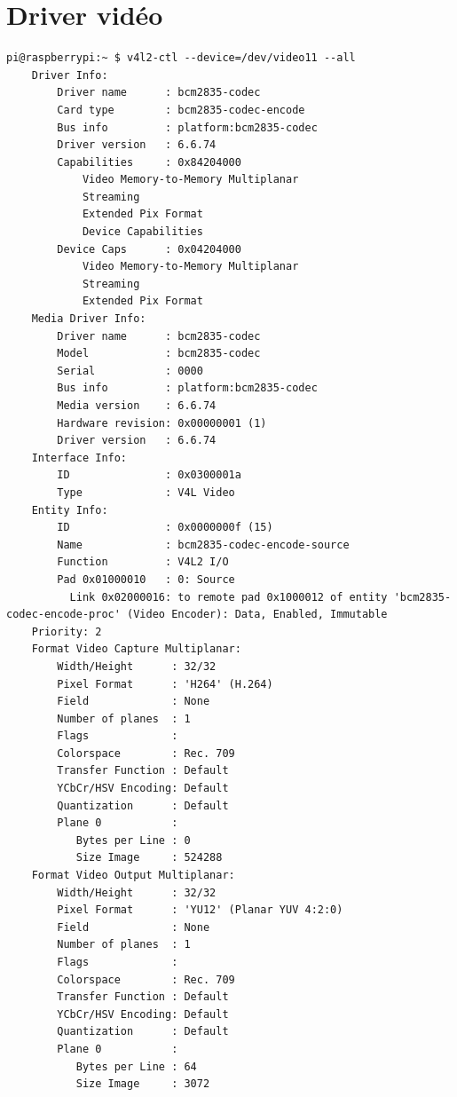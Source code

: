 \documentclass[a4paper, 11pt, french]{article}
\begin{document}
\section{Driver vidéo} \label{ann:driverVideo}
\begin{lstlisting}[caption={Propriétes du driver vidéo utilisé pour encoder le flux vidéo},captionpos=b]
    pi@raspberrypi:~ $ v4l2-ctl --device=/dev/video11 --all
    Driver Info:
        Driver name      : bcm2835-codec
        Card type        : bcm2835-codec-encode
        Bus info         : platform:bcm2835-codec
        Driver version   : 6.6.74
        Capabilities     : 0x84204000
            Video Memory-to-Memory Multiplanar
            Streaming
            Extended Pix Format
            Device Capabilities
        Device Caps      : 0x04204000
            Video Memory-to-Memory Multiplanar
            Streaming
            Extended Pix Format
    Media Driver Info:
        Driver name      : bcm2835-codec
        Model            : bcm2835-codec
        Serial           : 0000
        Bus info         : platform:bcm2835-codec
        Media version    : 6.6.74
        Hardware revision: 0x00000001 (1)
        Driver version   : 6.6.74
    Interface Info:
        ID               : 0x0300001a
        Type             : V4L Video
    Entity Info:
        ID               : 0x0000000f (15)
        Name             : bcm2835-codec-encode-source
        Function         : V4L2 I/O
        Pad 0x01000010   : 0: Source
          Link 0x02000016: to remote pad 0x1000012 of entity 'bcm2835-codec-encode-proc' (Video Encoder): Data, Enabled, Immutable
    Priority: 2
    Format Video Capture Multiplanar:
        Width/Height      : 32/32
        Pixel Format      : 'H264' (H.264)
        Field             : None
        Number of planes  : 1
        Flags             : 
        Colorspace        : Rec. 709
        Transfer Function : Default
        YCbCr/HSV Encoding: Default
        Quantization      : Default
        Plane 0           :
           Bytes per Line : 0
           Size Image     : 524288
    Format Video Output Multiplanar:
        Width/Height      : 32/32
        Pixel Format      : 'YU12' (Planar YUV 4:2:0)
        Field             : None
        Number of planes  : 1
        Flags             : 
        Colorspace        : Rec. 709
        Transfer Function : Default
        YCbCr/HSV Encoding: Default
        Quantization      : Default
        Plane 0           :
           Bytes per Line : 64
           Size Image     : 3072
    \end{lstlisting}
\end{document}
